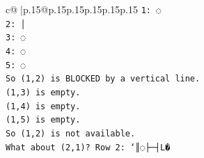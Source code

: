 \documentclass{article}
\begin{document}
{\begin{supertabular}{c@{$\;$}|p{.15\linewidth}@{}p{.15\linewidth}p{.15\linewidth}p{.15\linewidth}p{.15\linewidth}p{.15\linewidth}}
{{{\texttt{1: ◌} \\
\texttt{2: │} \\
\texttt{3: ◌} \\
\texttt{4: ◌} \\
\texttt{5: ◌} \\
\texttt{So (1,2) is BLOCKED by a vertical line.} \\
\texttt{(1,3) is empty.} \\
\texttt{(1,4) is empty.} \\
\texttt{(1,5) is empty.} \\
\texttt{So (1,2) is not available.} \\
\texttt{What about (2,1)? Row 2: `║◌├─┤L�} \\
            }
        }
    }
     \\ \\


\end{supertabular}}
\end{document}
